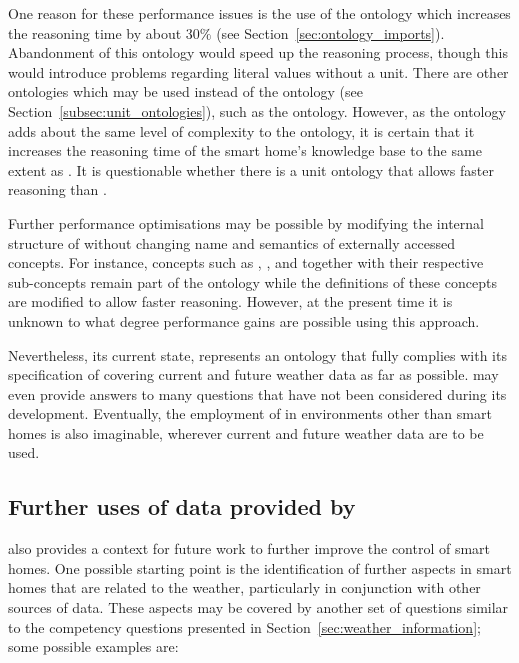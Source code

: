 One reason for these performance issues is the use of the \muo ontology which increases the reasoning time by about $30 \%$ (see Section~\ref{sec:ontology_imports}). Abandonment of this ontology would speed up the reasoning process, though this would introduce problems regarding literal values without a unit. There are other ontologies which may be used instead of the \muo ontology (see Section~\ref{subsec:unit_ontologies}), such as the  ontology. However, as the  ontology adds about the same level of complexity to the ontology, it is certain that it increases the reasoning time of the smart home's knowledge base to the same extent as \muo. It is questionable whether there is a unit ontology that allows faster reasoning than \muo.

Further performance optimisations may be possible by modifying the internal structure of \smarthomeweather without changing name and semantics of externally accessed concepts. For instance, concepts such as , , and  together with their respective sub-concepts remain part of the ontology while the definitions of these concepts are modified to allow faster reasoning. However, at the present time it is unknown to what degree performance gains are possible using this approach.

Nevertheless, its current state, \smarthomeweather represents an ontology that fully complies with its specification of covering current and future weather data as far as possible. \smarthomeweather may even provide answers to many questions that have not been considered during its development. Eventually, the employment of \smarthomeweather in environments other than smart homes is also imaginable, wherever current and future weather data are to be used.

\subsection{Further uses of data provided by \smarthomeweather}

\smarthomeweather also provides a context for future work to further improve the control of smart homes. One possible starting point is the identification of further aspects in smart homes that are related to the weather, particularly in conjunction with other sources of data. These aspects may be covered by another set of questions similar to the competency questions presented in Section~\ref{sec:weather_information}; some possible examples are:

